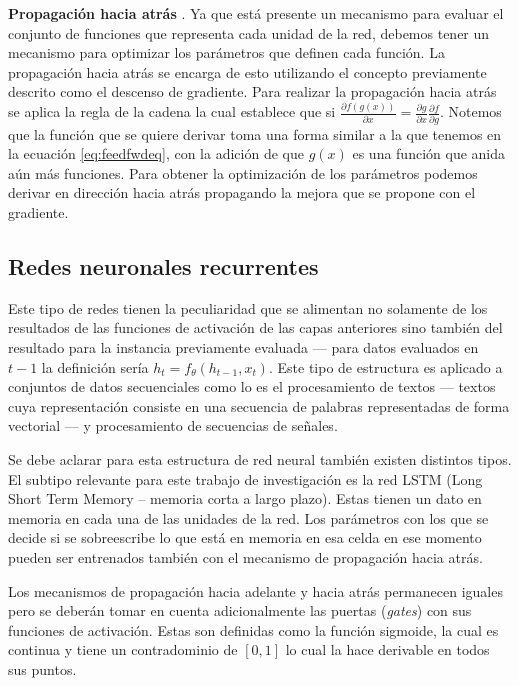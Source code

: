 \textbf{Propagación hacia atrás} \parencite{rumelhart1986learning}. Ya que está presente un mecanismo para evaluar el conjunto de funciones que representa cada unidad de la red, debemos tener un mecanismo para optimizar los parámetros que definen cada función. La propagación hacia atrás se encarga de esto utilizando el concepto previamente descrito como el descenso de gradiente. Para realizar la propagación hacia atrás se aplica la regla de la cadena la cual establece que si $\frac{\partial f(g(x))}{\partial x} = \frac{\partial g}{\partial x} \frac{\partial f}{\partial g}$. Notemos que la función que se quiere derivar toma una forma similar a la que tenemos en la ecuación \ref{eq:feedfwdeq}, con la adición de que $g(x)$ es una función que anida aún más funciones. Para obtener la optimización de los parámetros podemos derivar en dirección hacia atrás propagando la mejora que se propone con el gradiente.

\subsection{Redes neuronales recurrentes}



Este tipo de redes tienen la peculiaridad que se alimentan no solamente de los resultados de las funciones de activación de las capas anteriores sino también del resultado para la instancia previamente evaluada --- para datos evaluados en $t - 1$ la definición sería $h_t = f_{\theta}(h_{t-1}, x_t)$. Este tipo de estructura es aplicado a conjuntos de datos secuenciales como lo es el procesamiento de textos --- textos cuya representación consiste en una secuencia de palabras representadas de forma vectorial --- y procesamiento de secuencias de señales.

Se debe aclarar para esta estructura de red neural también existen distintos tipos. El subtipo relevante para este trabajo de investigación es la red LSTM (Long Short Term Memory -- memoria corta a largo plazo). Estas tienen un dato en memoria en cada una de las unidades de la red. Los parámetros con los que se decide si se sobreescribe lo que está en memoria en esa celda en ese momento pueden ser entrenados también con el mecanismo de propagación hacia atrás.

Los mecanismos de propagación hacia adelante y hacia atrás permanecen iguales pero se deberán tomar en cuenta adicionalmente las puertas (\textit{gates}) con sus funciones de activación. Estas son definidas como la función sigmoide, la cual es continua y tiene un contradominio de $[0,1]$ lo cual la hace derivable en todos sus puntos.

